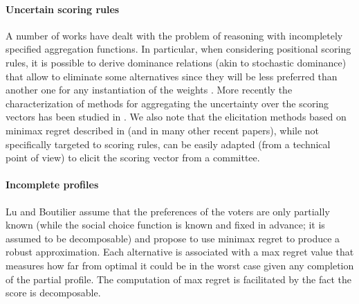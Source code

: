 \documentclass[12pt]{article}
\newcommand{\ppref}{\succ^\text{p}}%
\DeclareMathOperator{\PMR}{PMR}
\DeclareMathOperator{\MR}{MR}
\DeclareMathOperator{\MMR}{MMR}
\begin{document}
\paragraph{Uncertain scoring rules}
A number of works have dealt with the problem of reasoning with incompletely specified aggregation functions.
In particular, when considering positional scoring rules, it is possible to derive dominance relations (akin to stochastic dominance) that allow to eliminate some alternatives since they will be less preferred than another one for any instantiation of the weights \cite{Stein1994}.
More recently the characterization of methods for aggregating the uncertainty over the scoring vectors has been studied in \cite{Viappiani2018}.
We also note that the elicitation methods based on minimax regret described in \cite{Boutilier2006} (and in many other recent papers), while not specifically targeted to scoring rules, can be easily adapted (from a technical point of view) to elicit the scoring vector from a committee.

\paragraph{Incomplete profiles}

Lu and Boutilier \cite{Lu2011} assume that the preferences of the voters are only partially known (while the social choice function is known and fixed in advance; it is assumed to be decomposable) and 
 propose to use minimax regret to produce a robust approximation.
Each alternative is associated with a max regret value that measures how far from optimal it could be in the worst case given any completion of the partial profile.
The computation of max regret is facilitated by the fact the score is decomposable.
% 
\end{document}
